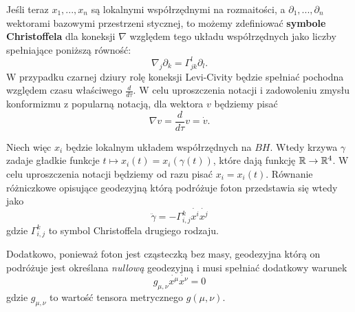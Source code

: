 
%

Jeśli teraz $x_1,..., x_n$ są lokalnymi współrzędnymi na rozmaitości, a $\partial_1,...,\partial_n$ wektorami bazowymi przestrzeni stycznej, to możemy zdefiniować \textbf{symbole Christoffela} dla koneksji $\nabla$ względem tego układu współrzędnych jako liczby spełniające poniższą równość:
$$ \nabla_j \partial_k=\Gamma_{j k}^l \partial_l. $$
W przypadku czarnej dziury rolę koneksji Levi-Civity będzie spełniać pochodna względem czasu właściwego $\frac{d}{d\tau}$. W celu uproszczenia notacji i zadowoleniu zmysłu konformizmu z popularną notacją, dla wektora $v$ będziemy pisać 
$$ \nabla v = \frac{d}{d\tau} v = \dot{v}. $$

Niech więc $x_i$ będzie lokalnym układem współrzędnych na $BH$. Wtedy krzywa $\gamma$ zadaje gładkie funkcje $t \mapsto x_i (t)=x_i (\gamma(t))$, które dają funkcję $\mathbb{R} \to \mathbb{R}^4$. W celu uproszczenia notacji będziemy 
od razu pisać $x_i=x_i(t)$. Równanie różniczkowe opisujące geodezyjną którą podróżuje foton przedstawia się wtedy jako
$$ \ddot{\gamma} = - \Gamma_{i,j}^k \dot{x^i} \dot{x^j} $$
gdzie $\Gamma_{i,j}^k$ to symbol Christoffela drugiego rodzaju.%

Dodatkowo, ponieważ foton jest cząsteczką bez masy, geodezyjna którą on podróżuje jest określana \emph{nullową} geodezyjną i musi spełniać dodatkowy warunek
$$ g_{\mu,\nu} \dot{x^\mu} \dot{x^\nu} = 0 $$
gdzie $g_{\mu,\nu}$ to wartość tensora metrycznego $g(\mu, \nu)$.




